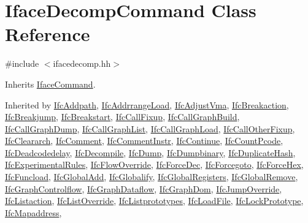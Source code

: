 \hypertarget{class_iface_decomp_command}{}\section{Iface\+Decomp\+Command Class Reference}
\label{class_iface_decomp_command}


{\ttfamily \#include $<$ifacedecomp.\+hh$>$}



Inherits \mbox{\hyperlink{class_iface_command}{Iface\+Command}}.



Inherited by \mbox{\hyperlink{class_ifc_addpath}{Ifc\+Addpath}}, \mbox{\hyperlink{class_ifc_addrrange_load}{Ifc\+Addrrange\+Load}}, \mbox{\hyperlink{class_ifc_adjust_vma}{Ifc\+Adjust\+Vma}}, \mbox{\hyperlink{class_ifc_breakaction}{Ifc\+Breakaction}}, \mbox{\hyperlink{class_ifc_breakjump}{Ifc\+Breakjump}}, \mbox{\hyperlink{class_ifc_breakstart}{Ifc\+Breakstart}}, \mbox{\hyperlink{class_ifc_call_fixup}{Ifc\+Call\+Fixup}}, \mbox{\hyperlink{class_ifc_call_graph_build}{Ifc\+Call\+Graph\+Build}}, \mbox{\hyperlink{class_ifc_call_graph_dump}{Ifc\+Call\+Graph\+Dump}}, \mbox{\hyperlink{class_ifc_call_graph_list}{Ifc\+Call\+Graph\+List}}, \mbox{\hyperlink{class_ifc_call_graph_load}{Ifc\+Call\+Graph\+Load}}, \mbox{\hyperlink{class_ifc_call_other_fixup}{Ifc\+Call\+Other\+Fixup}}, \mbox{\hyperlink{class_ifc_cleararch}{Ifc\+Cleararch}}, \mbox{\hyperlink{class_ifc_comment}{Ifc\+Comment}}, \mbox{\hyperlink{class_ifc_comment_instr}{Ifc\+Comment\+Instr}}, \mbox{\hyperlink{class_ifc_continue}{Ifc\+Continue}}, \mbox{\hyperlink{class_ifc_count_pcode}{Ifc\+Count\+Pcode}}, \mbox{\hyperlink{class_ifc_deadcodedelay}{Ifc\+Deadcodedelay}}, \mbox{\hyperlink{class_ifc_decompile}{Ifc\+Decompile}}, \mbox{\hyperlink{class_ifc_dump}{Ifc\+Dump}}, \mbox{\hyperlink{class_ifc_dumpbinary}{Ifc\+Dumpbinary}}, \mbox{\hyperlink{class_ifc_duplicate_hash}{Ifc\+Duplicate\+Hash}}, \mbox{\hyperlink{class_ifc_experimental_rules}{Ifc\+Experimental\+Rules}}, \mbox{\hyperlink{class_ifc_flow_override}{Ifc\+Flow\+Override}}, \mbox{\hyperlink{class_ifc_force_dec}{Ifc\+Force\+Dec}}, \mbox{\hyperlink{class_ifc_forcegoto}{Ifc\+Forcegoto}}, \mbox{\hyperlink{class_ifc_force_hex}{Ifc\+Force\+Hex}}, \mbox{\hyperlink{class_ifc_funcload}{Ifc\+Funcload}}, \mbox{\hyperlink{class_ifc_global_add}{Ifc\+Global\+Add}}, \mbox{\hyperlink{class_ifc_globalify}{Ifc\+Globalify}}, \mbox{\hyperlink{class_ifc_global_registers}{Ifc\+Global\+Registers}}, \mbox{\hyperlink{class_ifc_global_remove}{Ifc\+Global\+Remove}}, \mbox{\hyperlink{class_ifc_graph_controlflow}{Ifc\+Graph\+Controlflow}}, \mbox{\hyperlink{class_ifc_graph_dataflow}{Ifc\+Graph\+Dataflow}}, \mbox{\hyperlink{class_ifc_graph_dom}{Ifc\+Graph\+Dom}}, \mbox{\hyperlink{class_ifc_jump_override}{Ifc\+Jump\+Override}}, \mbox{\hyperlink{class_ifc_listaction}{Ifc\+Listaction}}, \mbox{\hyperlink{class_ifc_list_override}{Ifc\+List\+Override}}, \mbox{\hyperlink{class_ifc_listprototypes}{Ifc\+Listprototypes}}, \mbox{\hyperlink{class_ifc_load_file}{Ifc\+Load\+File}}, \mbox{\hyperlink{class_ifc_lock_prototype}{Ifc\+Lock\+Prototype}}, \mbox{\hyperlink{class_ifc_mapaddress}{Ifc\+Mapaddress}}, 